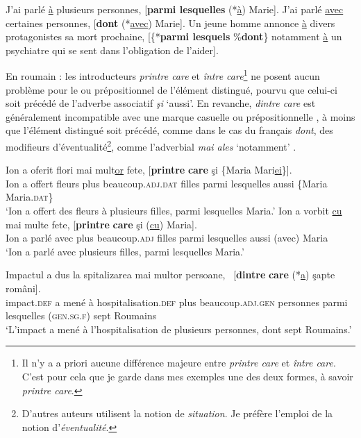 \ea \label{ch3:ex24}
\ea
J’ai parlé \uline{à} plusieurs personnes, [\textbf{parmi lesquelles} (*\uline{à}) Marie]. \label{ch3:ex24a}
\ex
J’ai parlé \uline{avec} certaines personnes, [\textbf{dont} (*\uline{avec}) Marie]. \label{ch3:ex24b}
\ex
Un jeune homme annonce \uline{à} divers protagonistes sa mort prochaine, [\{*\textbf{parmi lesquels} {\textbar} \%\textbf{dont}\} notamment \uline{à} un psychiatre qui se sent dans l’obligation de l’aider]. \label{ch3:ex24c} 
\z 
\z 

En roumain : les introducteurs \textit{printre care} et \textit{între care}\footnote{Il n’y a a priori aucune différence majeure entre \textit{printre care} et \textit{între care}. C’est pour cela que je garde dans mes exemples une des deux formes, à savoir \textit{printre care}.} ne posent aucun problème pour le   ou prépositionnel  de l’élément distingué, pourvu que celui-ci soit précédé de l’adverbe associatif \textit{şi} ‘aussi’. En revanche, \textit{dintre care} est généralement incompatible avec une marque casuelle  ou prépositionnelle , à moins que l’élément distingué soit précédé, comme dans le cas du français \textit{dont}, des modifieurs d’éventualité\footnote{D’autres auteurs utilisent la notion de \textit{situation}. Je préfère l’emploi de la notion d’\textit{éventualité}.}, comme l’adverbial \textit{mai ales} ‘notamment’ .

\ea \label{ch3:ex25}
\ea
\gll Ion  a  oferit  flori  mai  mult\uline{or} fete,  [\textbf{printre} \textbf{care}  şi \{Maria {\textbar} Mari\uline{ei}\}]. \label{ch3:ex25a}\\
Ion  a  offert  fleurs  plus  beaucoup.\textsc{adj.dat}  filles parmi  lesquelles  aussi \{Maria {\textbar} Maria.\textsc{dat}\}  \\
\glt ‘Ion a offert des fleurs à plusieurs filles, parmi lesquelles Maria.’ 
\ex 
\gll Ion  a  vorbit \uline{cu} mai  multe  fete,  [\textbf{printre} \textbf{care} şi  (\uline{cu}) Maria]. \label{ch3:ex25b}\\
Ion  a  parlé  avec  plus  beaucoup.\textsc{adj}  filles  parmi lesquelles  aussi  (avec) Maria\\
\glt ‘Ion a parlé avec plusieurs filles, parmi lesquelles Maria.’
\z 
\z 

\ea \label{ch3:ex26}
\ea
\gll Impactul  a  dus  la  spitalizarea  mai  multor  persoane, \ [\textbf{dintre} \textbf{care}  (*\uline{a})  şapte  români]. \label{ch3:ex26a}\\
impact.\textsc{def}  a  mené  à  hospitalisation.\textsc{def}  plus  beaucoup.\textsc{adj.gen}  personnes parmi  lesquelles  (\textsc{gen.sg.f})  sept  Roumains \\
\glt ‘L’impact a mené à l’hospitalisation de plusieurs personnes, dont sept Roumains.’  

